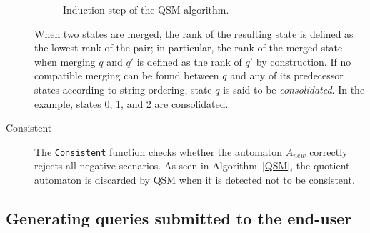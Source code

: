 \begin{description}
\begin{figure}[H]
\centering
{}
\caption{Induction step of the \textsc{QSM} algorithm\label{Fig:algo:steps}.}
\end{figure}

When two states are merged, the rank of the resulting state is defined as the lowest rank of the pair; in particular, the rank of the merged state when merging $q$ and $q'$ is defined as the rank of $q'$ by construction. If no compatible merging can be found between $q$ and any of its predecessor states according to string ordering, state $q$ is said to be \textsl{consolidated}. In the example, states 0, 1, and 2 are consolidated.

\item[Consistent] The \texttt{Consistent} function checks whether the automaton $A_{new}$ correctly rejects all negative scenarios. As seen in Algorithm~\ref{QSM}, the quotient automaton is discarded by \textsc{QSM} when it is detected not to be consistent.

\end{description}

\subsection{Generating queries submitted to the end-user\label{QSM:query}}

